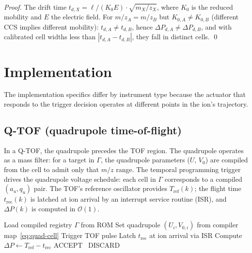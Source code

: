 \documentclass[twocolumn,10pt,a4paper]{article}
\theoremstyle{thmstyle}
\theoremstyle{definition}
\theoremstyle{remark}
\newcommand{\DP}{\Delta P}
\newcommand{\Tref}{T_{\mathrm{ref}}}
\newcommand{\trec}{t_{\mathrm{rec}}}
\newcommand{\calC}{\mathcal{C}}
\begin{document}
\begin{proof}
The drift time $t_{d,X} = \ell/(K_0 E) \cdot \sqrt{m_X/z_X}$, where
$K_0$ is the reduced mobility and $E$ the electric field. For
$m/z_A = m/z_B$ but $K_{0,A} \neq K_{0,B}$ (different CCS implies
different mobility): $t_{d,A} \neq t_{d,B}$, hence
$\DP_{d,A} \neq \DP_{d,B}$, and with calibrated cell widths less than
$|t_{d,A} - t_{d,B}|$, they fall in distinct cells. \qed
\end{proof}

\section{Implementation}
\label{sec:impl}

The implementation specifics differ by instrument type because the
actuator that responds to the trigger decision operates at different
points in the ion's trajectory.

\subsection{Q-TOF (quadrupole time-of-flight)}

In a Q-TOF, the quadrupole precedes the TOF region. The quadrupole
operates as a mass filter: for a target in $\Gamma$, the quadrupole
parameters ($U$, $V_0$) are compiled from the cell to admit only that
$m/z$ range. The temporal programming trigger drives the quadrupole
voltage schedule: each cell in $\Gamma$ corresponds to a compiled
$(a_u, q_u)$ pair. The TOF's reference oscillator provides $\Tref(k)$;
the flight time $\trec(k)$ is latched at ion arrival by an interrupt
service routine (ISR), and $\DP(k)$ is computed in $\mathcal{O}(1)$.

\begin{algorithm}[h]
\caption{Q-TOF temporal programming acquisition}
\label{alg:qtof}
\begin{algorithmic}[1]
\State Load compiled registry $\Gamma$ from ROM
\For{each target window $\calC_i \in \Gamma$}
  \State Set quadrupole $(U_i, V_{0,i})$ from compiler map~\eqref{eq:quad-cell}
  \State Trigger TOF pulse
  \State Latch $\trec$ at ion arrival via ISR
  \State Compute $\DP \gets \Tref - \trec$
  \If{$\DP \in \calC_i^{\mathrm{TOF}}$} ACCEPT \Else\ DISCARD
  \EndIf
\EndFor
\end{algorithmic}
\end{algorithm}
\end{document}
